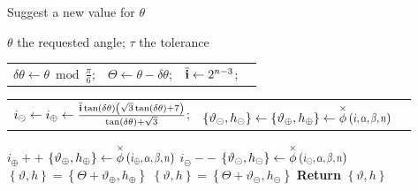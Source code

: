 \begin{algorithm}[H]\label{algo:newTheta}
  \caption{Suggest a new value for $\theta$}
 \begin{algorithmic}
  \State \phantom{Require}  { $\theta$ the requested angle; \quad \quad $\tau$ the tolerance}
 \State  \begin{tabular*}{\textwidth}{c @{\extracolsep{\fill}} lll}
 $\delta\theta \gets \theta \bmod{\frac{\pi}{6} }$; & $\Theta \gets \theta - \delta\theta$;  &  $\overline{\mathbf{i}} \gets  2^{n-3} $;
 \end{tabular*}
  \State  \begin{tabular*}{\textwidth}{c @{\extracolsep{\fill}} ll}
  $i_{\circleddash} \gets i_{\oplus} \gets \frac{\overline{\mathbf{i}} \tan (\delta \theta ) \left(\sqrt{3} \tan (\delta \theta )+7\right)}{\tan (\delta \theta )+\sqrt{3}} $; & 
  $  \left\{ \vartheta_{\circleddash}, h_{\circleddash} \right\} \gets \left\{ \vartheta_{\oplus}, h_{\oplus} \right\} \gets \thetaX{i, \alpha, \beta, n}$
  \end{tabular*}
 \State  $i_{\oplus}++$ \;
 \State  $\left\{ \vartheta_{\oplus}, h_{\oplus}\right\} \gets \thetaX{i_{\oplus}, \alpha, \beta, n}$
 \EndWhile
  \State   $i_{\circleddash}--$ \;
  \State  $\left\{ \vartheta_{\circleddash}, h_{\circleddash}\right\} \gets \thetaX{i_{\circleddash}, \alpha, \beta, n}$
 \EndWhile
  \If{ $\vartheta_{\oplus} -\delta\theta < \delta\theta - \vartheta_{\circleddash}$ }
 \State  $\left\{ \vartheta, h\right\}  = \left\{\Theta + \vartheta_{\oplus}, h_{\oplus}\right\}  $ 
 \Else
  \State $\left\{ \vartheta, h\right\}  = \left\{\Theta + \vartheta_{\circleddash}, h_{\circleddash}\right\} $
  \EndIf
 \State \textbf{Return} {$\left\{ \vartheta, h\right\} $ }
  \end{algorithmic}
 \end{algorithm}
 

